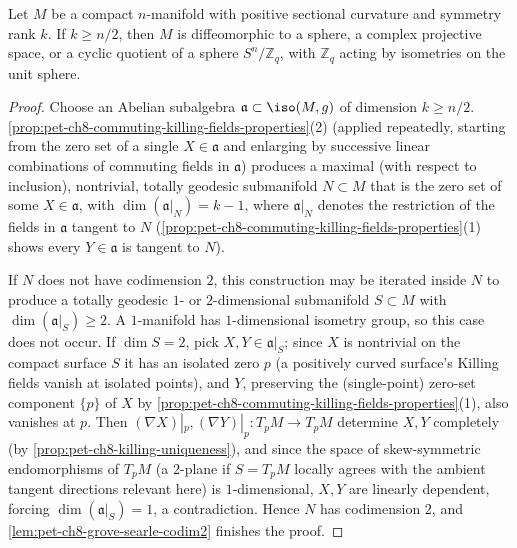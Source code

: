 \begin{theorem}
  \label{thm:pet-ch8-symmetry-rank-half-classification}
  Let $M$ be a compact $n$-manifold with positive sectional curvature and
  symmetry rank $k$. If $k\ge n/2$, then $M$ is diffeomorphic to a sphere, a
  complex projective space, or a cyclic quotient of a sphere $S^n/\mathbb{Z}_q$,
  with $\mathbb{Z}_q$ acting by isometries on the unit sphere.
\end{theorem}
\begin{proof}
  Choose an Abelian subalgebra $\mathfrak a\subset\iso(M,g)$ of dimension
  $k\ge n/2$. \cref{prop:pet-ch8-commuting-killing-fields-properties}(2)
  (applied repeatedly, starting from the zero set of a single $X\in\mathfrak a$
  and enlarging by successive linear combinations of commuting fields in
  $\mathfrak a$) produces a maximal (with respect to inclusion), nontrivial,
  totally geodesic submanifold $N\subset M$ that is the zero set of some
  $X\in\mathfrak a$, with $\dim(\mathfrak a|_N)=k-1$, where $\mathfrak a|_N$
  denotes the restriction of the fields in $\mathfrak a$ tangent to $N$
  (\cref{prop:pet-ch8-commuting-killing-fields-properties}(1) shows every
  $Y\in\mathfrak a$ is tangent to $N$).

  If $N$ does not have codimension $2$, this construction may be iterated
  inside $N$ to produce a totally geodesic $1$- or $2$-dimensional submanifold
  $S\subset M$ with $\dim(\mathfrak a|_S)\ge2$. A $1$-manifold has
  $1$-dimensional isometry group, so this case does not occur. If $\dim S=2$,
  pick $X,Y\in\mathfrak a|_S$; since $X$ is nontrivial on the compact surface
  $S$ it has an isolated zero $p$ (a positively curved surface's Killing fields
  vanish at isolated points), and $Y$, preserving the (single-point) zero-set
  component $\{p\}$ of $X$ by
  \cref{prop:pet-ch8-commuting-killing-fields-properties}(1), also vanishes at
  $p$. Then $(\nabla X)|_p,(\nabla Y)|_p:T_pM\to T_pM$ determine $X,Y$
  completely (by \cref{prop:pet-ch8-killing-uniqueness}), and since the space
  of skew-symmetric endomorphisms of $T_pM$ (a $2$-plane if $S=T_pM$ locally
  agrees with the ambient tangent directions relevant here) is $1$-dimensional,
  $X,Y$ are linearly dependent, forcing $\dim(\mathfrak a|_S)=1$, a
  contradiction. Hence $N$ has codimension $2$, and
  \cref{lem:pet-ch8-grove-searle-codim2} finishes the proof.
\end{proof}

